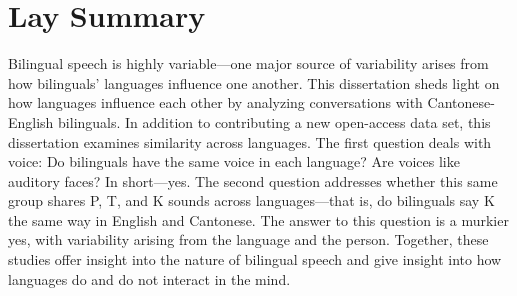 
\chapter{Lay Summary}

Bilingual speech is highly variable---one major source of variability arises from how bilinguals' languages influence one another. This dissertation sheds light on how languages influence each other by analyzing conversations with Cantonese-English bilinguals. In addition to contributing a new open-access data set, this dissertation examines similarity across languages. The first question deals with voice: Do bilinguals have the same voice in each language? Are voices like auditory faces? In short---yes. The second question addresses whether this same group shares P, T, and K sounds across languages---that is, do bilinguals say K the same way in English and Cantonese. The answer to this question is a murkier yes, with variability arising from the language and the person. Together, these studies offer insight into the nature of bilingual speech and give insight into how languages do and do not interact in the mind. 
 

\endinput %
